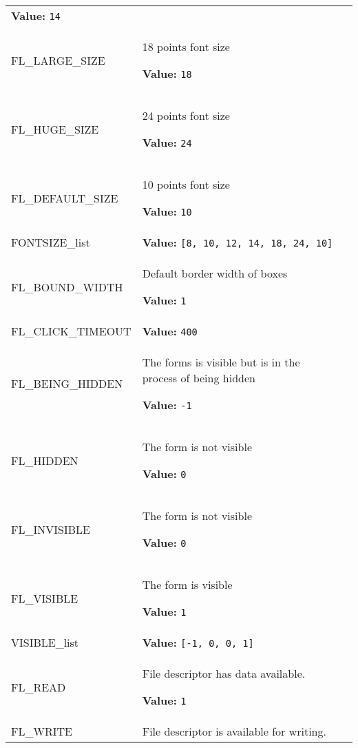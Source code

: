 \begin{longtable}{|p{\varnamewidth}|p{\vardescrwidth}|l}
\textbf{Value:} 
{\tt 14}&\\
\cline{1-2}
\raggedright F\-L\-\_\-L\-A\-R\-G\-E\-\_\-S\-I\-Z\-E\- & \raggedright 18 points font size

\textbf{Value:} 
{\tt 18}&\\
\cline{1-2}
\raggedright F\-L\-\_\-H\-U\-G\-E\-\_\-S\-I\-Z\-E\- & \raggedright 24 points font size

\textbf{Value:} 
{\tt 24}&\\
\cline{1-2}
\raggedright F\-L\-\_\-D\-E\-F\-A\-U\-L\-T\-\_\-S\-I\-Z\-E\- & \raggedright 10 points font size

\textbf{Value:} 
{\tt 10}&\\
\cline{1-2}
\raggedright F\-O\-N\-T\-S\-I\-Z\-E\-\_\-l\-i\-s\-t\- & \raggedright \textbf{Value:} 
{\tt \texttt{[}8\texttt{, }10\texttt{, }12\texttt{, }14\texttt{, }18\texttt{, }24\texttt{, }10\texttt{]}}&\\
\cline{1-2}
\raggedright F\-L\-\_\-B\-O\-U\-N\-D\-\_\-W\-I\-D\-T\-H\- & \raggedright Default border width of boxes

\textbf{Value:} 
{\tt 1}&\\
\cline{1-2}
\raggedright F\-L\-\_\-C\-L\-I\-C\-K\-\_\-T\-I\-M\-E\-O\-U\-T\- & \raggedright \textbf{Value:} 
{\tt 400}&\\
\cline{1-2}
\raggedright F\-L\-\_\-B\-E\-I\-N\-G\-\_\-H\-I\-D\-D\-E\-N\- & \raggedright The forms is visible but is in the process of being hidden

\textbf{Value:} 
{\tt -1}&\\
\cline{1-2}
\raggedright F\-L\-\_\-H\-I\-D\-D\-E\-N\- & \raggedright The form is not visible

\textbf{Value:} 
{\tt 0}&\\
\cline{1-2}
\raggedright F\-L\-\_\-I\-N\-V\-I\-S\-I\-B\-L\-E\- & \raggedright The form is not visible

\textbf{Value:} 
{\tt 0}&\\
\cline{1-2}
\raggedright F\-L\-\_\-V\-I\-S\-I\-B\-L\-E\- & \raggedright The form is visible

\textbf{Value:} 
{\tt 1}&\\
\cline{1-2}
\raggedright V\-I\-S\-I\-B\-L\-E\-\_\-l\-i\-s\-t\- & \raggedright \textbf{Value:} 
{\tt \texttt{[}-1\texttt{, }0\texttt{, }0\texttt{, }1\texttt{]}}&\\
\cline{1-2}
\raggedright F\-L\-\_\-R\-E\-A\-D\- & \raggedright File descriptor has data available.

\textbf{Value:} 
{\tt 1}&\\
\cline{1-2}
\raggedright F\-L\-\_\-W\-R\-I\-T\-E\- & \raggedright File descriptor is available for writing.


\end{longtable}
